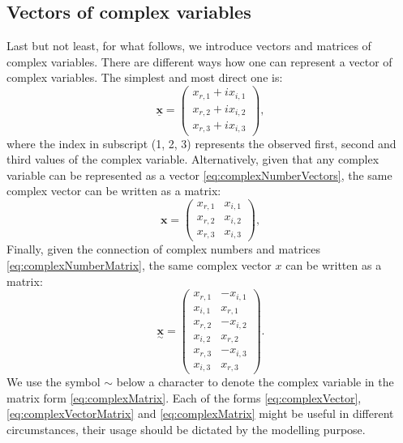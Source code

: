 \documentclass[
]{book}
\begin{document}
\hypertarget{vectorComplexVariables}{%
\subsection{Vectors of complex variables}\label{vectorComplexVariables}}

Last but not least, for what follows, we introduce vectors and matrices of complex variables. There are different ways how one can represent a vector of complex variables. The simplest and most direct one is:
\begin{equation}
    \underline{\mathbf{x}} = \begin{pmatrix} x_{r,1} + i x_{i,1} \\ x_{r,2} + i x_{i,2} \\ x_{r,3} + i x_{i,3} \end{pmatrix} ,
    \label{eq:complexVector}
\end{equation}
where the index in subscript (1, 2, 3) represents the observed first, second and third values of the complex variable. Alternatively, given that any complex variable can be represented as a vector \eqref{eq:complexNumberVectors}, the same complex vector can be written as a matrix:
\begin{equation}
    \mathbf{x} = \begin{pmatrix} x_{r,1} & x_{i,1} \\ x_{r,2} & x_{i,2} \\ x_{r,3} & x_{i,3} \end{pmatrix} ,
    \label{eq:complexVectorMatrix}
\end{equation}
Finally, given the connection of complex numbers and matrices \eqref{eq:complexNumberMatrix}, the same complex vector \(x\) can be written as a matrix:
\begin{equation}
    \underset{\sim}{\mathbf{x}} = \begin{pmatrix} x_{r,1} & - x_{i,1} \\ x_{i,1} & x_{r,1} \\
                                 x_{r,2} & - x_{i,2} \\ x_{i,2} & x_{r,2} \\
                                 x_{r,3} & - x_{i,3} \\ x_{i,3} & x_{r,3} \end{pmatrix} .
    \label{eq:complexMatrix}
\end{equation}
We use the symbol \(\sim\) below a character to denote the complex variable in the matrix form \eqref{eq:complexMatrix}. Each of the forms \eqref{eq:complexVector}, \eqref{eq:complexVectorMatrix} and \eqref{eq:complexMatrix} might be useful in different circumstances, their usage should be dictated by the modelling purpose.
\end{document}

